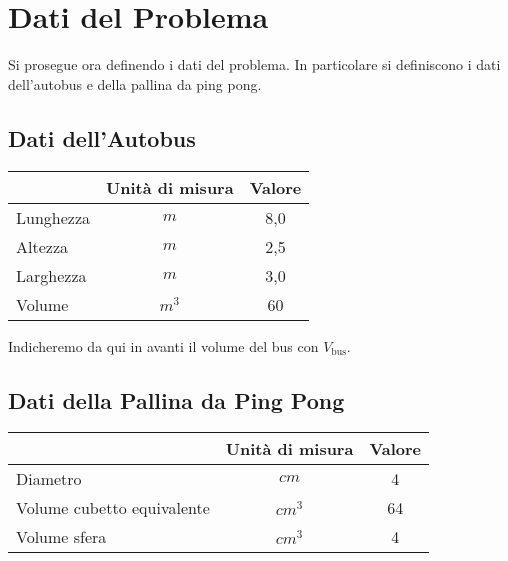
\section{Dati del Problema}

Si prosegue ora definendo i dati del problema. In particolare si definiscono i dati dell'autobus e della pallina da ping pong.

\subsection{Dati dell'Autobus}
\begin{center}
    \begin{tabular}{|l|c|c|}
        \hline
        ~         & Unità di misura & Valore \\
        \hline
        Lunghezza & $m$             & 8,0    \\
        Altezza   & $m$             & 2,5    \\
        Larghezza & $m$             & 3,0    \\
        \hline
        Volume    & $m^3$           & 60     \\
        \hline
    \end{tabular}
\end{center}

Indicheremo da qui in avanti il volume del bus con $V_{\text{bus}}$.

\subsection{Dati della Pallina da Ping Pong}
\begin{center}
    \begin{tabular}{|l|c|c|}
        \hline
        ~                          & Unità di misura & Valore \\
        \hline
        Diametro                   & $cm$            & 4      \\
        Volume cubetto equivalente & $cm^3$          & 64     \\
        Volume sfera               & $cm^3$          & 4      \\
        \hline
    \end{tabular}
\end{center}